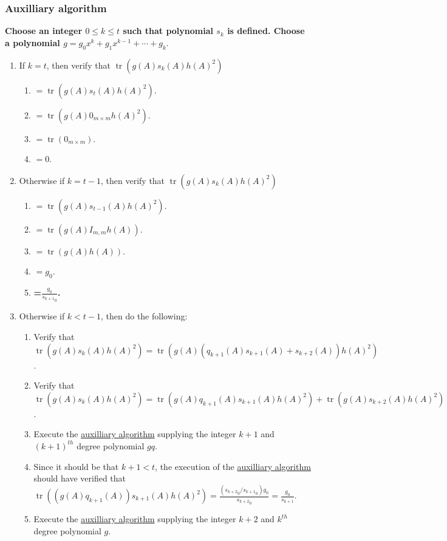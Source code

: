 \documentclass[twocolumn]{article}
\DeclareMathOperator{\tr}{tr}
\begin{document}
			\subsubsection{Auxilliary algorithm}\label{sec:algorithm 47 auxilliary algorithm}
				\textbf{Choose an integer $0\le k\le t$ such that polynomial $s_k$ is defined. Choose a polynomial $g=g_0x^k+g_1x^{k-1}+\cdots+g_k.$}
				\begin{enumerate}
					\item If $k=t$, then verify that $\tr(g(A)s_k(A)h(A)^2)$
					\begin{enumerate}
						\item $=\tr(g(A)s_t(A)h(A)^2)$.
						\item $=\tr(g(A)0_{m\times m}h(A)^2)$.
						\item $=\tr(0_{m\times m})$.
						\item $=0$.
					\end{enumerate}
					\item Otherwise if $k=t-1$, then verify that $\tr(g(A)s_k(A)h(A)^2)$
					\begin{enumerate}
						\item $=\tr(g(A)s_{t-1}(A)h(A)^2)$.
						\item $=\tr(g(A)I_{m,m}h(A))$.
						\item $=\tr(g(A)h(A))$.
						\item $=g_0$.
						\item \textbf{=$\frac{g_0}{{s_{k+1}}_0}$.}
					\end{enumerate}
					\item Otherwise if $k<t-1$, then do the following:
					\begin{enumerate}
						\item Verify that $\tr(g(A)s_k(A)h(A)^2)=\tr(g(A)(q_{k+1}(A)s_{k+1}(A)+s_{k+2}(A))h(A)^2)$.
						\item Verify that $\tr(g(A)s_k(A)h(A)^2)=\tr(g(A)q_{k+1}(A)s_{k+1}(A)h(A)^2)+\tr(g(A)s_{k+2}(A)h(A)^2)$.
						\item Execute the \hyperref[sec:algorithm 47 auxilliary algorithm]{auxilliary algorithm} supplying the integer $k+1$ and $(k+1)^{th}$ degree polynomial $gq$.
						\item Since it should be that $k+1<t$, the execution of the \hyperref[sec:algorithm 47 auxilliary algorithm]{auxilliary algorithm} should have verified that $\tr((g(A)q_{k+1}(A))s_{k+1}(A)h(A)^2)=\frac{({s_{k+2}}_0/{s_{k+1}}_0)g_0}{{s_{k+2}}_0}=\frac{g_0}{s_{k+1}}$.
						\item Execute the \hyperref[sec:algorithm 47 auxilliary algorithm]{auxilliary algorithm} supplying the integer $k+2$ and $k^{th}$ degree polynomial $g$.

\end{enumerate}
\end{enumerate}
\end{document}
